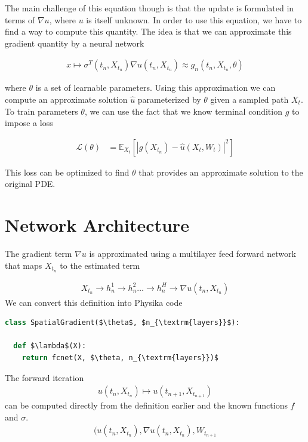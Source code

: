 \documentclass[book.tex]{subfiles}
\begin{document}
The main challenge of this equation though is that the update is formulated in terms of $\nabla u$, where $u$ is itself unknown. In order to use this equation, we have to find a way to compute this quantity. The idea is that we can approximate this gradient quantity by a neural network

\begin{align}
    x \mapsto \sigma^T(t_n, X_{t_n})\nabla u(t_n, X_{t_n}) \approx g_n(t_n, X_{t_n}, \theta)
\end{align}

where $\theta$ is a set of learnable parameters. Using this approximation we can compute an approximate solution $\hat{u}$ parameterized by $\theta$ given a sampled path $X_t$. To train parameters $\theta$, we can use the fact that we know terminal condition $g$ to impose a loss

\begin{align}
\mathcal{L}(\theta) &= \mathbb{E}_{X_t} \left [ \left | g(X_{t_n}) - \hat{u}(X_t, W_t)\right |^2 \right ]
\end{align}

This loss can be optimized to find $\theta$ that provides an approximate solution to the original PDE.

\section{Network Architecture}

The gradient term $\nabla u$ is approximated using a multilayer feed forward network that maps $X_{t_n}$ to the estimated term

\begin{align}
    X_{t_n} \to h^1_n \to h^2_n \dotsc \to h^H_n \to \nabla u(t_n, X_{t_n})
\end{align}
We can convert this definition into Physika code

\begin{lstlisting}[language=python]
class SpatialGradient($\theta$, $n_{\textrm{layers}}$):

  def $\lambda$(X):
    return fcnet(X, $\theta, n_{\textrm{layers}})$

\end{lstlisting}

The forward iteration 
\begin{align}
u(t_n, X_{t_n}) \mapsto u(t_{n+1}, X_{t_{n+1}})
\end{align}
can be computed directly from the definition earlier and the known functions $f$ and $\sigma$.
\begin{align}
    (u(t_n, X_{t_n}), \nabla u(t_n, X_{t_n}), W_{t_{n+1}} %
\end{align}
\end{document}
